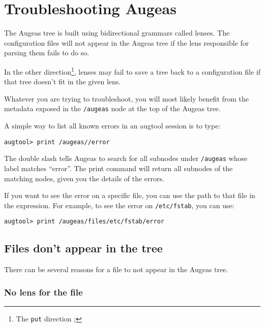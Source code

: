 \chapter{Troubleshooting Augeas}

\label{chap:troubleshooting} 

The Augeas tree is built using bidirectional grammars called lenses. The configuration files will not appear in the Augeas tree if the lens responsible for parsing them fails to do so.

In the other direction\footnote{The \verb!put! direction ; }, lenses may fail to save a tree back to a configuration file if that tree doesn't fit in the given lens.

Whatever you are trying to troubleshoot, you will most likely benefit from the metadata exposed in the \verb!/augeas! node at the top of the Augeas tree.

A simple way to list all known errors in an augtool session is to type:

 

\begin{verbatim}
augtool> print /augeas//error
\end{verbatim}

The double slash tells Augeas to search for all subnodes under \verb!/augeas! whose label matches ``error''. The print command will return all subnodes of the matching nodes, given you the details of the errors.

If you want to see the error on a specific file, you can use the path to that file in the expression. For example, to see the error on \verb!/etc/fstab!, you can use:

 

\begin{verbatim}
augtool> print /augeas/files/etc/fstab/error
\end{verbatim}

\section{Files don't appear in the tree}

There can be several reasons for a file to not appear in the Augeas tree.

\subsection{No lens for the file}

